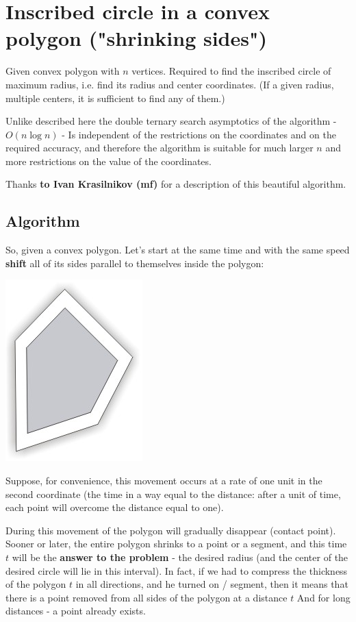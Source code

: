 \section{ Inscribed circle in a convex polygon ("shrinking sides") }
Given convex polygon with $n$ vertices. Required to find the inscribed circle of maximum radius, i.e. find its radius and center coordinates. (If a given radius, multiple centers, it is sufficient to find any of them.)

Unlike described here the double ternary search asymptotics of the algorithm - $O (n \log n)$ - Is independent of the restrictions on the coordinates and on the required accuracy, and therefore the algorithm is suitable for much larger $n$ and more restrictions on the value of the coordinates.

Thanks \textbf{to Ivan Krasilnikov (mf)} for a description of this beautiful algorithm.

\subsection{ Algorithm }

So, given a convex polygon. Let's start at the same time and with the same speed \textbf{shift} all of its sides parallel to themselves inside the polygon:

\includegraphics[scale=1]{5.jpg}

Suppose, for convenience, this movement occurs at a rate of one unit in the second coordinate (the time in a way equal to the distance: after a unit of time, each point will overcome the distance equal to one).

During this movement of the polygon will gradually disappear (contact point). Sooner or later, the entire polygon shrinks to a point or a segment, and this time $t$ will be the \textbf{answer to the problem} - the desired radius (and the center of the desired circle will lie in this interval). In fact, if we had to compress the thickness of the polygon $t$ in all directions, and he turned on / segment, then it means that there is a point removed from all sides of the polygon at a distance $t$ And for long distances - a point already exists.

